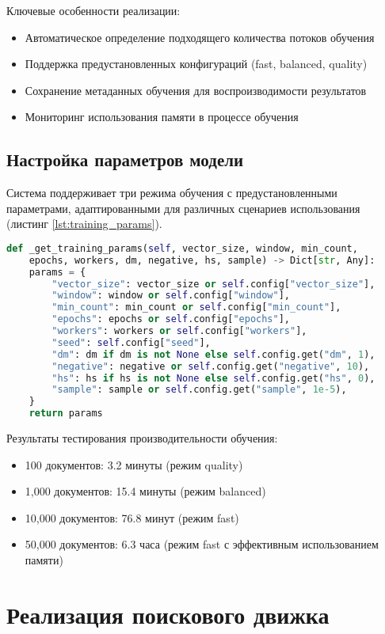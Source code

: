 Ключевые особенности реализации:
\begin{itemize}
	\item Автоматическое определение подходящего количества потоков обучения
	\item Поддержка предустановленных конфигураций (fast, balanced, quality)
	\item Сохранение метаданных обучения для воспроизводимости результатов
	\item Мониторинг использования памяти в процессе обучения
\end{itemize}

\subsection{Настройка параметров модели}

Система поддерживает три режима обучения с предустановленными параметрами, адаптированными для различных сценариев использования (листинг \ref{lst:training_params}).

\begin{lstlisting}[language=Python,caption={Получение параметров обучения},label=lst:training_params]
	def _get_training_params(self, vector_size, window, min_count, 
	epochs, workers, dm, negative, hs, sample) -> Dict[str, Any]:
	params = {
		"vector_size": vector_size or self.config["vector_size"],
		"window": window or self.config["window"],
		"min_count": min_count or self.config["min_count"],
		"epochs": epochs or self.config["epochs"],
		"workers": workers or self.config["workers"],
		"seed": self.config["seed"],
		"dm": dm if dm is not None else self.config.get("dm", 1),
		"negative": negative or self.config.get("negative", 10),
		"hs": hs if hs is not None else self.config.get("hs", 0),
		"sample": sample or self.config.get("sample", 1e-5),
	}
	return params
\end{lstlisting}

Результаты тестирования производительности обучения:
\begin{itemize}
	\item 100 документов: 3.2 минуты (режим quality)
	\item 1,000 документов: 15.4 минуты (режим balanced)
	\item 10,000 документов: 76.8 минут (режим fast)
	\item 50,000 документов: 6.3 часа (режим fast с эффективным использованием памяти)
\end{itemize}

\section{Реализация поискового движка}

